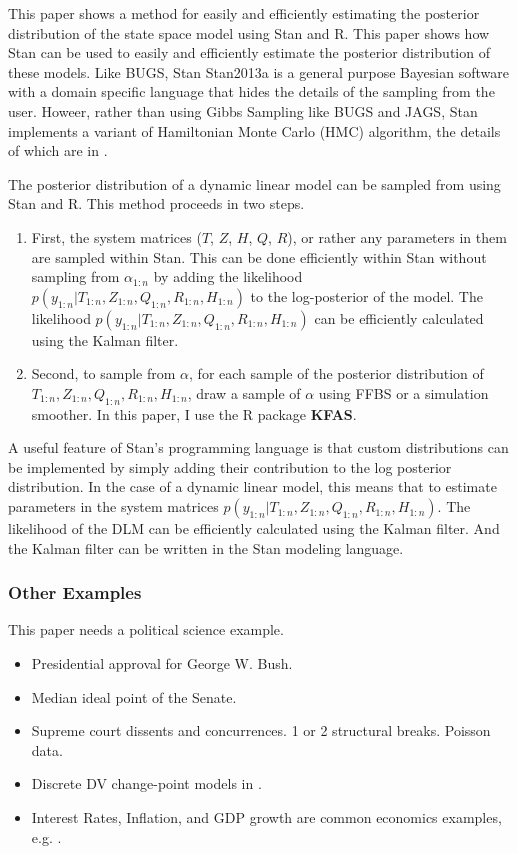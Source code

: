 \documentclass{article}
\begin{document}
This paper shows a method for easily and efficiently estimating the posterior distribution of the state space model using Stan and R.
This paper shows how Stan can be used to easily and efficiently estimate the posterior distribution of these models.
Like BUGS, Stan \textcite{Stan2013}{Stan2013a} is a general purpose Bayesian software with a domain specific language that hides the details of the sampling from the user.
Howeer, rather than using Gibbs Sampling like BUGS and JAGS, Stan implements a variant of Hamiltonian Monte Carlo (HMC) algorithm, the details of which are in \textcite{HoffmanGelman2013}.

The posterior distribution of a dynamic linear model can be sampled from using Stan and R.
This method proceeds in two steps.
\begin{enumerate}
\item First, the system matrices ($T$, $Z$, $H$, $Q$, $R$), or rather any parameters in them are sampled within Stan. This can be done efficiently within Stan without sampling from $\alpha_{1:n}$ by adding the likelihood $p(y_{1:n} | T_{1:n}, Z_{1:n}, Q_{1:n}, R_{1:n}, H_{1:n})$ to the log-posterior of the model.
The likelihood $p(y_{1:n} | T_{1:n}, Z_{1:n}, Q_{1:n}, R_{1:n}, H_{1:n})$ can be efficiently calculated using the Kalman filter.
\item Second, to sample from $\alpha$, for each sample of the posterior distribution of $T_{1:n}, Z_{1:n}, Q_{1:n}, R_{1:n}, H_{1:n}$, draw a sample of $\alpha$ using FFBS or a simulation smoother. In this paper, I use the R package \textbf{KFAS}.
\end{enumerate}

A useful feature of Stan's programming language is that custom distributions can be implemented by simply adding their contribution to the log posterior distribution.
In the case of a dynamic linear model, this means that to estimate parameters in the system matrices  $p(y_{1:n} | T_{1:n}, Z_{1:n}, Q_{1:n}, R_{1:n}, H_{1:n})$.
The likelihood of the DLM can be efficiently calculated using the Kalman filter. 
And the Kalman filter can be written in the Stan modeling language.

\clearpage{}

\subsubsection{Other Examples}

This paper needs a political science example.

\begin{itemize}
\item Presidential approval for George W. Bush. \parencites{RatkovicEng2010}
\item Median ideal point of the Senate. \parencites{RatkovicEng2010}
\item Supreme court dissents and concurrences. 1 or 2 structural breaks. Poisson data. \parencite{CalderiaZorn1998}
\item Discrete DV change-point models in \parencite{spirling2007bayesian}.
\item Interest Rates, Inflation, and GDP growth are common economics examples, e.g. \textcite{GiordaniKohn2008}.
\end{itemize}
\end{document}
